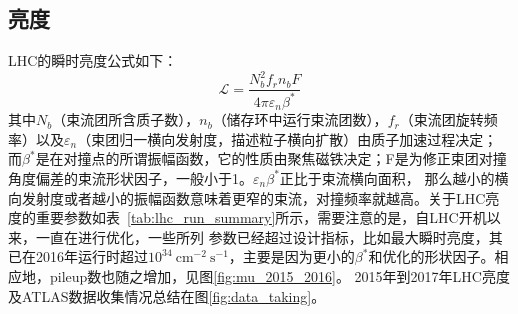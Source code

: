 \subsection{亮度}
LHC的瞬时亮度公式如下：
\begin{equation}
\mathcal{L}=\frac{N_{b}^{2}f_{r}n_{b}F}{4\pi\varepsilon_{n}\beta^{*}}
\end{equation}
其中$N_b$（束流团所含质子数），$n_b$（储存环中运行束流团数），$f_{r}$（束流团旋转频率）以及$\varepsilon_n$（束团归一横向发射度，描述粒子横向扩散）由质子加速过程决定；
而$\beta^{*}$是在对撞点的所谓振幅函数，它的性质由聚焦磁铁决定；F是为修正束团对撞角度偏差的束流形状因子，一般小于1。$\varepsilon_{n}\beta^{*}$正比于束流横向面积，
那么越小的横向发射度或者越小的振幅函数意味着更窄的束流，对撞频率就越高。关于LHC亮度的重要参数如表~\ref{tab:lhc_run_summary}所示，需要注意的是，自LHC开机以来，一直在进行优化，一些所列
参数已经超过设计指标，比如最大瞬时亮度，其已在2016年运行时超过$10^{34}~\text{cm}^{-2}~\text{s}^{-1}$，主要是因为更小的$\beta^{*}$和优化的形状因子。相应地，pileup数也随之增加，见图\ref{fig:mu_2015_2016}。
2015年到2017年LHC亮度及ATLAS数据收集情况总结在图\ref{fig:data_taking}。
\begin{table}[h]
\centering
{}
\caption{LHC设计指标，以及在2015年和2016年的运行参数~\cite{LHC-Run-Summary}}
\label{tab:lhc_run_summary}
\end{table}

